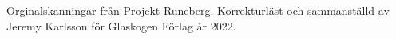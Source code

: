 Orginalskanningar från Projekt Runeberg. Korrekturläst och sammanställd av Jeremy Karlsson för Glaskogen Förlag år 2022.
